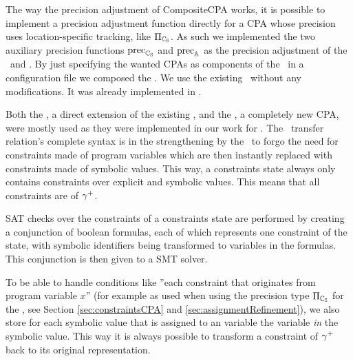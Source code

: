 The way the precision adjustment of CompositeCPA works, it is possible to implement a precision adjustment function directly for a CPA whose precision uses location-specific tracking, like $\Pi_{\mathbb{C_{S}}}$.
As such we implemented the two auxiliary precision functions $\operatorname{\text{prec}}_{\mathbb{C_{S}}}$ and $\operatorname{\text{prec}}_{\mathbb{A}}$ as the precision adjustment of the \symbolicValueAnalysisCPA\ and \constraintsCPA.
By just specifying the wanted CPAs as components of the \compositeCPA\ in a configuration file we composed the \symbolicExecutionCPA.
We use the existing \locationCPA\ without any modifications. It was already implemented in \cpaChecker.

Both the \symbolicValueAnalysisCPA, a direct extension of the existing ,
and the \constraintsCPA, a completely new CPA, were mostly used as they were implemented in our work for \cite{Lemberger2015}.
The \constraintsCPA\ transfer relation's complete syntax is in the strengthening by the \symbolicValueAnalysisCPA\ to forgo the need for constraints made of program variables which are then instantly replaced with constraints made of symbolic values.
This way, a constraints state always only contains constraints over explicit and symbolic values. This means that all constraints are of ${\gamma^+}$.

SAT checks over the constraints of a constraints state are performed by creating a conjunction of boolean formulas, each of which represents one constraint of the state, with symbolic identifiers being transformed to variables in the formulas. This conjunction is then given to a SMT solver.

To be able to handle conditions like ''each constraint that originates from program variable $x$'' (for example as used when using the precision type $\Pi_{\mathbb{C_{S}}}$ for the \constraintsCPA, see Section \ref{sec:constraintsCPA} and \ref{sec:assignmentRefinement}),
we also store for each symbolic value that is assigned to an variable the variable \emph{in} the symbolic value.
This way it is always possible to transform a constraint of ${\gamma^+}$ back to its original representation.
